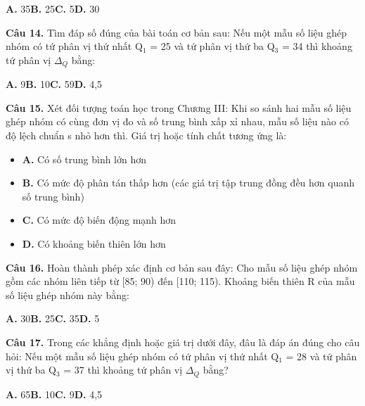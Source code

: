\documentclass[11pt,a4paper]{article}
\begin{document}
\hspace*{1.5em}\textbf{A.} 35\quad\quad \textbf{B.} 25\quad\quad \textbf{C.} 5\quad\quad \textbf{D.} 30\par\vspace{2pt}
\textbf{\color{primary} Câu 14.} Tìm đáp số đúng của bài toán cơ bản sau: Nếu một mẫu số liệu ghép nhóm có tứ phân vị thứ nhất Q$_1$ = 25 và tứ phân vị thứ ba Q$_3$ = 34 thì khoảng tứ phân vị $\Delta_Q$ bằng:\par
\hspace*{1.5em}\textbf{A.} 9\quad\quad \textbf{B.} 10\quad\quad \textbf{C.} 59\quad\quad \textbf{D.} 4,5\par\vspace{2pt}
\textbf{\color{primary} Câu 15.} Xét đối tượng toán học trong Chương III: Khi so sánh hai mẫu số liệu ghép nhóm có cùng đơn vị đo và số trung bình xấp xỉ nhau, mẫu số liệu nào có độ lệch chuẩn s nhỏ hơn thì. Giá trị hoặc tính chất tương ứng là:\par
\begin{itemize}\setlength{\itemsep}{1pt}\setlength{\parskip}{0pt}
  \item[] \textbf{A.} Có số trung bình lớn hơn
  \item[] \textbf{B.} Có mức độ phân tán thấp hơn (các giá trị tập trung đồng đều hơn quanh số trung bình)
  \item[] \textbf{C.} Có mức độ biến động mạnh hơn
  \item[] \textbf{D.} Có khoảng biến thiên lớn hơn
\end{itemize}\vspace{2pt}
\textbf{\color{primary} Câu 16.} Hoàn thành phép xác định cơ bản sau đây: Cho mẫu số liệu ghép nhóm gồm các nhóm liên tiếp từ [85; 90) đến [110; 115). Khoảng biến thiên R của mẫu số liệu ghép nhóm này bằng:\par
\hspace*{1.5em}\textbf{A.} 30\quad\quad \textbf{B.} 25\quad\quad \textbf{C.} 35\quad\quad \textbf{D.} 5\par\vspace{2pt}
\textbf{\color{primary} Câu 17.} Trong các khẳng định hoặc giá trị dưới đây, đâu là đáp án đúng cho câu hỏi: Nếu một mẫu số liệu ghép nhóm có tứ phân vị thứ nhất Q$_1$ = 28 và tứ phân vị thứ ba Q$_3$ = 37 thì khoảng tứ phân vị $\Delta_Q$ bằng?\par
\hspace*{1.5em}\textbf{A.} 65\quad\quad \textbf{B.} 10\quad\quad \textbf{C.} 9\quad\quad \textbf{D.} 4,5\par\vspace{2pt}
\end{document}

